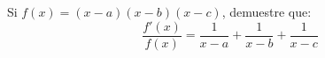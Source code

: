 \item Si $f(x) = (x-a)(x-b)(x-c)$, demuestre que:
$$\frac{f'(x)}{f(x)} = \frac{1}{x-a} + \frac{1}{x-b} + \frac{1}{x-c}$$
